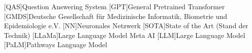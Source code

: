 \begin{acronym}[SPARQL]
    [QAS]{Question Answering System}
    [GPT]{General Pretrained Transformer}
    [GMDS]{Deutsche Gesellschaft für Medizinische Informatik, Biometrie und Epidemiologie e.V.}
    [NN]{Neuronales Netzwerk}
    [SOTA]{State of the Art (Stand der Technik)}
    [LLaMa]{Large Language Model Meta AI}
    [LLM]{Large Language Model}
    [PaLM]{Pathways Language Model}
\end{acronym}
